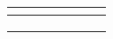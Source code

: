 \begin{table}[]
\begin{tabular}{c|c|c|c|c|c|c|}
\multicolumn{1}{|c|}{}                                                           &                                                                          &                         &                                                                           &                                                                 &                       &                                                                       \\ \hline
\multicolumn{1}{|c|}{}                                                           &                                                                          &                         &                                                                           &                                                                 &                       &                                                                       \\ \hline
\multicolumn{1}{|c|}{}                                                           &                                                                          &                         &                                                                           &                                                                 &                       &                                                                       \\ \hline
\multicolumn{1}{|c|}{}                                                           &                                                                          &                         &                                                                           &                                                                 &                       &                                                                       \\ \hline
\end{tabular}
\end{table}